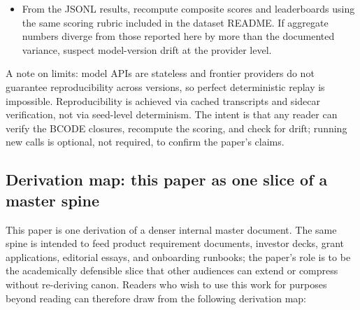 \documentclass{article}
\providecommand{\tightlist}{\setlength{\itemsep}{0pt}\setlength{\parskip}{0pt}}
\begin{document}
\begin{enumerate}
  \begin{itemize}
  \tightlist
  \item
    From the JSONL results, recompute composite scores and leaderboards
    using the same scoring rubric included in the dataset README. If
    aggregate numbers diverge from those reported here by more than the
    documented variance, suspect model-version drift at the provider
    level.
  \end{itemize}
\end{enumerate}

A note on limits: model APIs are stateless and frontier providers do not
guarantee reproducibility across versions, so perfect deterministic
replay is impossible. Reproducibility is achieved via cached transcripts
and sidecar verification, not via seed-level determinism. The intent is
that any reader can verify the BCODE closures, recompute the scoring,
and check for drift; running new calls is optional, not required, to
confirm the paper's claims.

\subsection{Derivation map: this paper as one slice of a master
spine}\label{derivation-map-this-paper-as-one-slice-of-a-master-spine}

This paper is one derivation of a denser internal master document. The
same spine is intended to feed product requirement documents, investor
decks, grant applications, editorial essays, and onboarding runbooks;
the paper's role is to be the academically defensible slice that other
audiences can extend or compress without re-deriving canon. Readers who
wish to use this work for purposes beyond reading can therefore draw
from the following derivation map:
\end{document}
